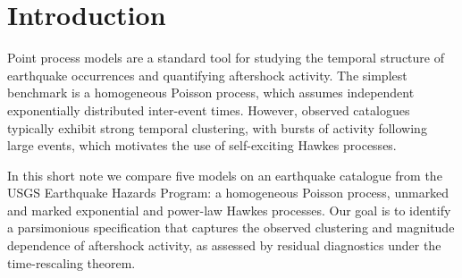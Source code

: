 \section{Introduction}

Point process models are a standard tool for studying the temporal
structure of earthquake occurrences and quantifying aftershock activity.
The simplest benchmark is a homogeneous Poisson process, which assumes
independent exponentially distributed inter-event times. However,
observed catalogues typically exhibit strong temporal clustering, with
bursts of activity following large events, which motivates the use of
self-exciting Hawkes processes.

In this short note we compare five models on an earthquake catalogue
from the USGS Earthquake Hazards Program: a homogeneous Poisson process,
unmarked and marked exponential and power-law Hawkes processes. Our goal
is to identify a parsimonious specification that captures the observed
clustering and magnitude dependence of aftershock activity, as assessed
by residual diagnostics under the time-rescaling theorem.
